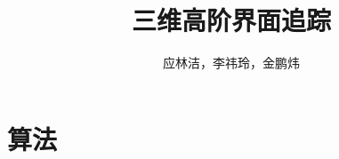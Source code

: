 \documentclass[11pt]{article}
\begin{document}

 \theoremstyle{definition}%
 \newtheorem{thm}{{定理}}
 \newtheorem{lem}[thm]{{引理}}
 \newtheorem{defn}[thm]{{定义}}
\newtheorem{prop}[thm]{{性质}}
 \newtheorem{cor}[thm]{{推论}}
 \newtheorem{nota}[thm]{{记号}}
 \newtheorem{exm}{{例}}
 \newtheorem{rem}[exm]{{注}}
 \newtheorem*{pro}{证明}

\title{三维高阶界面追踪}
\author{应林洁，李祎玲，金鹏炜}
\date{}
\maketitle



\section{算法}
\label{sec:algorithm}






\end{document}
